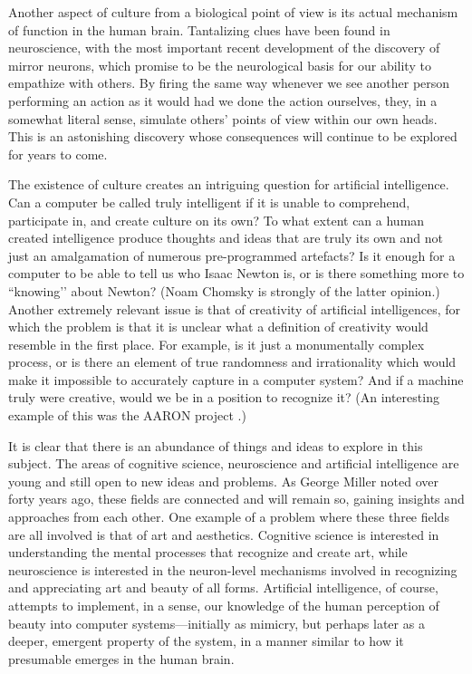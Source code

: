 \documentclass[11pt,a4paper]{article}
\begin{document}
Another aspect of culture from a biological point of view is its actual mechanism of function in the human brain. Tantalizing clues have been found in neuroscience, with the most important recent development of the discovery of mirror neurons, which promise to be the neurological basis for our ability to empathize with others. By firing the same way whenever we see another person performing an action as it would had we done the action ourselves, they, in a somewhat literal sense, simulate others’ points of view within our own heads. This is an astonishing discovery whose consequences will continue to be explored for years to come.

The existence of culture creates an intriguing question for artificial intelligence. Can a computer be called truly intelligent if it is unable to comprehend, participate in, and create culture on its own? To what extent can a human created intelligence produce thoughts and ideas that are truly its own and not just an amalgamation of numerous pre-programmed artefacts? Is it enough for a computer to be able to tell us who Isaac Newton is, or is there something more to ``knowing’’ about Newton? (Noam Chomsky is strongly of the latter opinion.\cite{chomsky}) Another extremely relevant issue is that of creativity of artificial intelligences, for which the problem is that it is unclear what a definition of creativity would resemble in the first place.  For example, is it just a monumentally complex process, or is there an element of true randomness and irrationality which would make it impossible to accurately capture in a computer system? And if a machine truly were creative, would we be in a position to recognize it? (An interesting example of this was the AARON project \cite{aaron}.)

It is clear that there is an abundance of things and ideas to explore in this subject. The areas of cognitive science, neuroscience and artificial intelligence are young and still open to new ideas and problems. As George Miller\cite{miller} noted over forty years ago, these fields are connected and will remain so, gaining insights and approaches from each other. One example of a problem where these three fields are all involved is that of art and aesthetics. Cognitive science is interested in understanding the mental processes that recognize and create art, while neuroscience is interested in the neuron-level mechanisms involved in recognizing and appreciating art and beauty of all forms. Artificial intelligence, of course, attempts to implement, in a sense, our knowledge of the human perception of beauty into computer systems---initially as mimicry, but perhaps later as a deeper, emergent property of the system, in a manner similar to how it presumable emerges in the human brain.
\end{document}
